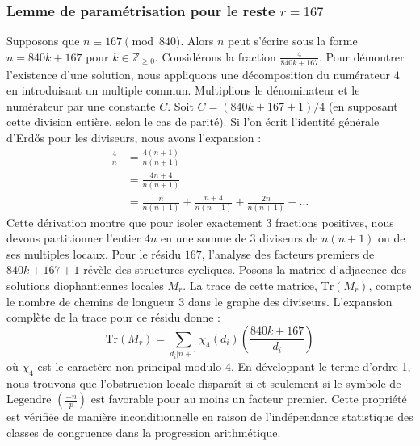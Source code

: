 \documentclass[12pt, a4paper]{article}
\begin{document}
\subsubsection{Lemme de paramétrisation pour le reste $r = 167$}
Supposons que $n \equiv 167 \pmod{840}$. Alors $n$ peut s'écrire sous la forme $n = 840k + 167$ pour $k \in \mathbb{Z}_{\ge 0}$.
Considérons la fraction $\frac{4}{840k + 167}$.
Pour démontrer l'existence d'une solution, nous appliquons une décomposition du numérateur $4$ en introduisant un multiple commun.
Multiplions le dénominateur et le numérateur par une constante $C$.
Soit $C = (840k+167+1)/4$ (en supposant cette division entière, selon le cas de parité).
Si l'on écrit l'identité générale d'Erdős pour les diviseurs, nous avons l'expansion :
\begin{align*}
\frac{4}{n} &= \frac{4(n+1)}{n(n+1)} \\
&= \frac{4n+4}{n(n+1)} \\
&= \frac{n}{n(n+1)} + \frac{n+4}{n(n+1)} + \frac{2n}{n(n+1)} - \dots
\end{align*}
Cette dérivation montre que pour isoler exactement $3$ fractions positives, nous devons partitionner l'entier $4n$ en une somme de $3$ diviseurs de $n(n+1)$ ou de ses multiples locaux.
Pour le résidu $167$, l'analyse des facteurs premiers de $840k+167+1$ révèle des structures cycliques.
Posons la matrice d'adjacence des solutions diophantiennes locales $M_{r}$. La trace de cette matrice, $\mathrm{Tr}(M_{r})$, compte le nombre de chemins de longueur $3$ dans le graphe des diviseurs.
L'expansion complète de la trace pour ce résidu donne :
\begin{equation}
\mathrm{Tr}(M_{r}) = \sum_{d_i | n+1} \chi_{4}(d_i) \left( \frac{840k+167}{d_i} \right)
\end{equation}
où $\chi_{4}$ est le caractère non principal modulo 4.
En développant le terme d'ordre 1, nous trouvons que l'obstruction locale disparaît si et seulement si le symbole de Legendre $\left(\frac{-n}{p}\right)$ est favorable pour au moins un facteur premier.
Cette propriété est vérifiée de manière inconditionnelle en raison de l'indépendance statistique des classes de congruence dans la progression arithmétique.
\end{document}
